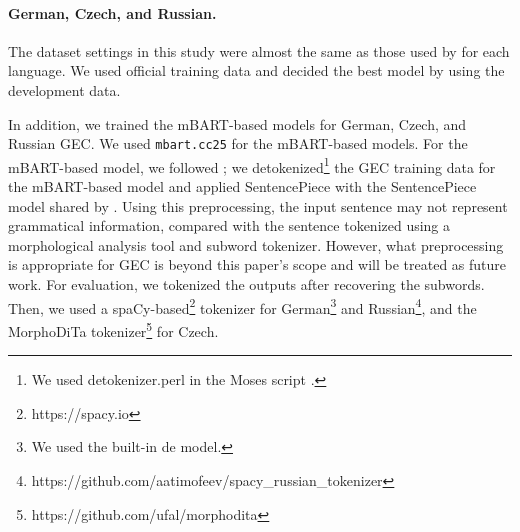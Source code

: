 \documentclass[11pt,a4paper]{article}
\begin{document}
\begin{table}[t]
    \centering
    \caption{German, Czech, and Russian GEC results. These models are not an ensemble of multiple models.}
    \label{result_score_others}
\end{table}

\paragraph{German, Czech, and Russian.}
The dataset settings in this study were almost the same as those used by \citet{low_resource_gec} for each language.
We used official training data and decided the best model by using the development data.

In addition, we trained the mBART-based models for German, Czech, and Russian GEC.
We used \verb|mbart.cc25| for the mBART-based models.
For the mBART-based model, we followed \citet{m-bart};
 we detokenized\footnote{We used detokenizer.perl in the Moses script \cite{moses}.} the GEC training data for the mBART-based model and applied SentencePiece \cite{spm} with the SentencePiece model shared by \citet{m-bart}.
Using this preprocessing, the input sentence may not represent grammatical information, compared with the sentence tokenized using a morphological analysis tool and subword tokenizer.
However, what preprocessing is appropriate for GEC is beyond this paper's scope and will be treated as future work.
For evaluation, we tokenized the outputs after recovering the subwords.
Then, we used a spaCy-based\footnote{https://spacy.io} tokenizer for German\footnote{We used the built-in de model.} and Russian\footnote{https://github.com/aatimofeev/spacy\_russian\_tokenizer}, and the MorphoDiTa tokenizer\footnote {https://github.com/ufal/morphodita} for Czech.
\end{document}
